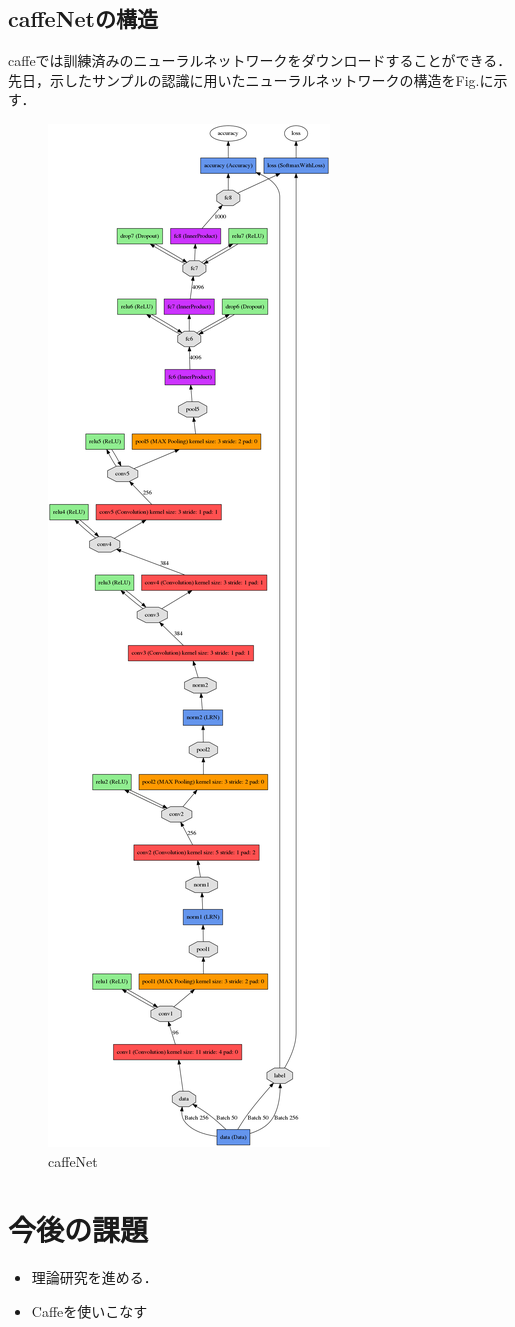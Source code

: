 \documentclass[a4paper,10pt]{jsarticle}
\begin{document}
\subsection{caffeNetの構造}
caffeでは訓練済みのニューラルネットワークをダウンロードすることができる．先日，示したサンプルの認識に用いたニューラルネットワークの構造をFig.に示す．
\begin{figure}[t]
 \centering
 \includegraphics[scale=0.2]{fig/png/caffeNet.png}
  \caption{caffeNet}
\end{figure}

\section{今後の課題}
\begin{itemize}
 \item 理論研究を進める．
 \item Caffeを使いこなす
\end{itemize}
\end{document}
